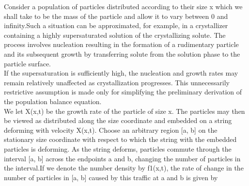 Consider a population of particles distributed according to their size x which we shall take to be the mass of the particle and allow it to vary between 0 and infinity.Such a situation can be approximated, for example, in a crystallizer containing a highly supersaturated solution of the crystallizing solute. The process involves nucleation resulting in the formation of a rudimentary particle and its subsequent growth by transferring solute from the solution phase to the particle surface.\\
If the supersaturation is sufficiently high, the nucleation and growth rates may remain relatively unaffected as crystallization progresses. This unnecessarily restrictive assumption is made only for simplifying the preliminary derivation of the population balance equation.\\
We let X(x,t) be the growth rate of the particle of size x. The particles may then be viewed as distributed along the size coordinate and embedded on a string deforming with velocity X(x,t). Choose an arbitrary region [a, b] on the stationary size coordinate with respect to which the string with the embedded particles is deforming. 
As the string deforms, particles commute through the interval [a, b] across the endpoints a and b, changing the number of particles in the interval.If we denote the number density by f1(x,t), the rate of change in the number of particles in [a, b] caused by this traffic at a and b is given by
